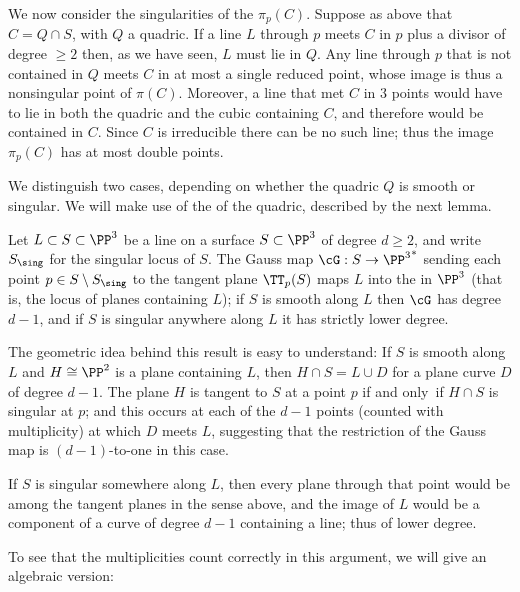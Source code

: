We now consider the singularities of the
%
$\pi_p(C)$.
Suppose as above that $C = Q\cap S$, with $Q$ a quadric. If a line $L$
through $p$ meets $C$ in $p$ plus a divisor of degree $\geq 2$ then,
as we have seen, $L$ must lie in $Q$.  Any line through $p$ that is
not contained in $Q$ meets $C$ in at most a single reduced point,
whose image is thus a nonsingular point of $\pi(C)$. Moreover, a line
that met $C$ in
$3$ points would have to lie in both the quadric and
the cubic containing $C$, and therefore would be contained in $C$.
Since $C$ is irreducible there can be no such line; thus the image
$\pi_p(C)$ has at most double points.

We distinguish two cases, depending on whether
the quadric $Q$ is smooth or singular. We will make use of the
%
of the quadric,
described by the next lemma.

\begin{lemma}
Let $L \subset S \subset \PP^3$ be a line on a surface $S \subset \PP^3$ of degree $d \geq 2$, and
write $S_{\sing}$ for the singular locus of $S$. The Gauss map $\cG :
S \to {\PP^3}^*$ sending each point $p \in S\setminus S_{\sing}$ to
the tangent plane $\TT_p(S)$ maps $L$ into the
%
in $\PP^3$ (that is, the locus of planes containing $L$); if $S$ is
smooth along $L$ then $\cG$  has degree $d-1$, and if $S$ is singular
anywhere along $L$ it has strictly lower degree.
\unif
\end{lemma}

The geometric idea behind this result is easy to understand: If $S$ is
smooth along $L$ and $H\cong \PP^{2}$ is a plane containing $L$, then
$H\cap S = L \cup D$ for a plane curve $D$ of degree $d-1$. The plane
$H$ is tangent to $S$ at a point $p$ if and only~if $H\cap S$ is
singular at $p$; and this occurs at each of the $d-1$ points (counted
with multiplicity) at which $D$ meets $L$, suggesting that the
restriction of the Gauss map is $(d{-}1)$-to-one in this case.

If $S$ is singular somewhere along $L$, then every plane through that point would be among the tangent
planes in the sense above, and the image of $L$ would be a component of a curve of degree $d-1$ containing a line; thus of lower degree.

To see that the multiplicities count correctly in this argument, we will give an algebraic version:
\unif

